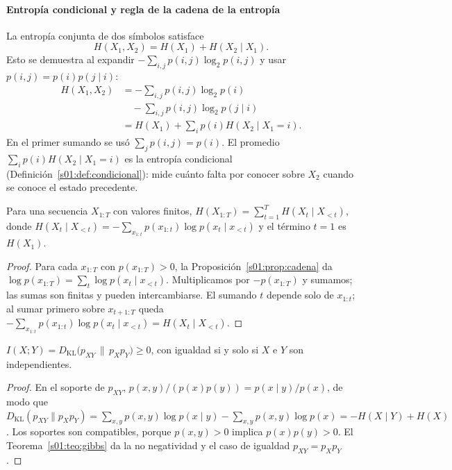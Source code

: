 \paragraph{Entropía condicional y regla de la cadena de la entropía}
La entropía conjunta de dos símbolos satisface
\[
H(X_1,X_2)=H(X_1)+H(X_2\mid X_1).
\]
Esto se demuestra al expandir
$-\sum_{i,j}p(i,j)\log_2 p(i,j)$ y usar
$p(i,j)=p(i)p(j\mid i)$:
\[
\begin{split}
H(X_1,X_2)&=-\sum_{i,j}p(i,j)\log_2p(i)\\
&\quad-\sum_{i,j}p(i,j)\log_2p(j\mid i)\\
&=H(X_1)+\sum_i p(i)H(X_2\mid X_1=i).
\end{split}
\]
En el primer sumando se usó $\sum_jp(i,j)=p(i)$. El promedio
$\sum_i p(i)H(X_2\mid X_1=i)$ es la entropía condicional
(Definición~\ref{s01:def:condicional}): mide cuánto falta por conocer sobre $X_2$
cuando se conoce el estado precedente.
\begin{proposicion}\label{s01:prop:cadenaH}
Para una secuencia $X_{1:T}$ con valores finitos,
$H(X_{1:T})=\sum_{t=1}^TH(X_t\mid X_{<t})$, donde
$H(X_t\mid X_{<t})=-\sum_{x_{1:t}}p(x_{1:t})\log p(x_t\mid x_{<t})$ y el término
$t=1$ es $H(X_1)$.
\end{proposicion}
\begin{proof}
Para cada $x_{1:T}$ con $p(x_{1:T})>0$, la Proposición~\ref{s01:prop:cadena} da
$\log p(x_{1:T})=\sum_t\log p(x_t\mid x_{<t})$. Multiplicamos por $-p(x_{1:T})$ y
sumamos; las sumas son finitas y pueden intercambiarse. El sumando $t$ depende solo
de $x_{1:t}$; al sumar primero sobre $x_{t+1:T}$ queda
$-\sum_{x_{1:t}}p(x_{1:t})\log p(x_t\mid x_{<t})=H(X_t\mid X_{<t})$.
\end{proof}

\begin{proposicion}\label{s01:prop:im}
$I(X;Y)=D_{\mathrm{KL}}\bigl(p_{XY}\,\|\,p_Xp_Y\bigr)\ge0$, con igualdad si y solo
si $X$ e $Y$ son independientes.
\end{proposicion}
\begin{proof}
En el soporte de $p_{XY}$, $p(x,y)/(p(x)p(y))=p(x\mid y)/p(x)$, de modo que
$D_{\mathrm{KL}}(p_{XY}\|p_Xp_Y)=\sum_{x,y}p(x,y)\log p(x\mid y)-\sum_{x,y}p(x,y)\log p(x)
=-H(X\mid Y)+H(X)$. Los soportes son compatibles, porque $p(x,y)>0$ implica
$p(x)p(y)>0$. El Teorema~\ref{s01:teo:gibbs} da la no negatividad y el caso de
igualdad $p_{XY}=p_Xp_Y$.
\end{proof}

